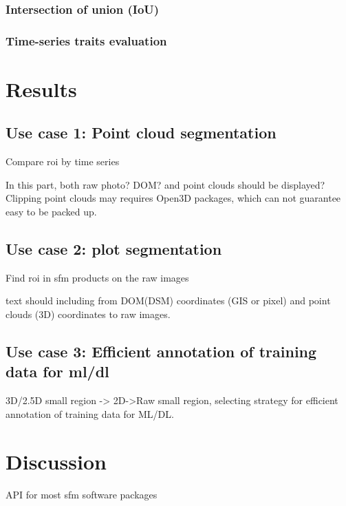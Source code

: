 \documentclass[sensors,article,submit,moreauthors, xelatex]{Definitions/mdpi}
\begin{document}
\subsubsection{Intersection of union (IoU)}

\subsubsection{Time-series traits evaluation}


\section{Results}

\subsection{Use case 1: Point cloud segmentation}
Compare \acrshort*{roi} by time series

In this part, both raw photo? DOM? and point clouds should be displayed? Clipping point clouds may requires Open3D packages, which can not guarantee easy to be packed up.

\subsection{Use case 2: plot segmentation}

Find \acrshort*{roi} in \acrshort*{sfm} products on the raw images

text \cite{ma_calculation_2019, guo_illumination_2013}
should including from DOM(DSM) coordinates (GIS or pixel) and point clouds (3D) coordinates to raw images.

\subsection{Use case 3: Efficient annotation of training data for \acrshort*{ml}/\acrshort*{dl}}
3D/2.5D small region -> 2D->Raw small region, selecting strategy for efficient annotation of training data for ML/DL.

\section{Discussion}

API for most \acrshort*{sfm} software packages
\end{document}
